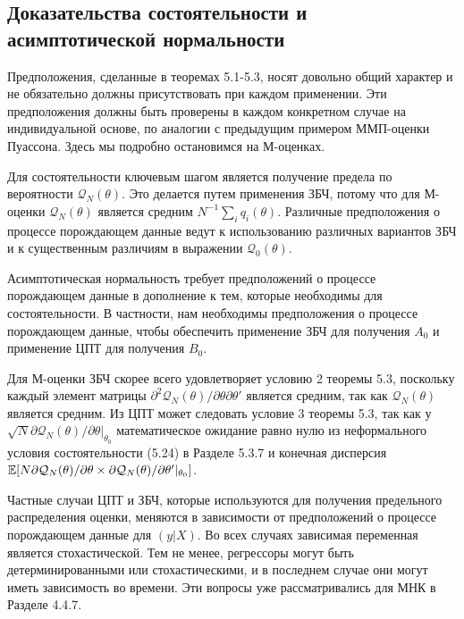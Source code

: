 \subsection{Доказательства состоятельности и асимптотической нормальности}

Предположения, сделанные в теоремах 5.1-5.3, носят довольно общий характер и не обязательно должны присутствовать при каждом применении. Эти предположения должны быть проверены в каждом конкретном случае на индивидуальной основе, по аналогии с предыдущим примером ММП-оценки Пуассона. Здесь мы подробно остановимся на М-оценках.

Для состоятельности ключевым шагом является получение предела по вероятности $\mathcal{Q}_N(\theta)$. Это делается путем применения ЗБЧ, потому что для М-оценки $\mathcal{Q}_N(\theta)$ является средним $N^{-1} \sum_i q_i(\theta)$. Различные предположения о процессе порождающем данные ведут к использованию различных вариантов ЗБЧ и к существенным различиям в выражении $\mathcal{Q}_0(\theta)$.

Асимптотическая нормальность требует предположений о процессе порождающем данные в дополнение к тем, которые необходимы для состоятельности. В частности, нам необходимы предположения о процессе порождающем данные, чтобы обеспечить применение ЗБЧ для получения $A_0$ и применение ЦПТ для получения $B_0$.

Для М-оценки ЗБЧ скорее всего удовлетворяет условию 2 теоремы 5.3, поскольку каждый элемент матрицы $\partial^2 \mathcal{Q}_N(\theta) / \partial \theta \partial \theta'$ является средним, так как $\mathcal{Q}_N(\theta)$ является средним. Из ЦПТ может следовать условие 3 теоремы 5.3, так как у $\sqrt{N} \partial \mathcal{Q}_N(\theta) / \partial \theta|_{\theta_0}$ математическое ожидание равно нулю из неформального условия состоятельности (5.24) в Разделе 5.3.7 и конечная дисперсия $\mathbb{E}[N \partial \mathcal{Q}_N(\theta) / \partial \theta \times \partial \mathcal{Q}_N(\theta) / \partial \theta'|_{\theta_0}]$.

Частные случаи ЦПТ и ЗБЧ, которые используются для получения предельного распределения оценки, меняются в зависимости от предположений о процессе порождающем данные для $(y|X)$. Во всех случаях зависимая переменная является стохастической. Тем не менее, регрессоры могут быть детерминированными или стохастическими, и в последнем случае они могут иметь зависимость во времени. Эти вопросы уже рассматривались для МНК в Разделе 4.4.7.

